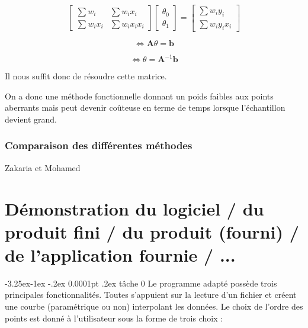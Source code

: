 \documentclass[a4paper,12pt]{article} %
\makeatletter
\renewcommand\paragraph{\@startsection{paragraph}{4}{\z@}%
                                      {-3.25ex\@plus -1ex \@minus -.2ex}%
                                      {0.0001pt \@plus .2ex}%
                                      {\normalfont\normalsize\bfseries}}
\makeatother
\begin{document}
                    
                    
                        \[\begin{bmatrix} \sum w_i & \sum w_i x_i \\ \sum w_i x_i & \sum w_i x_i x_i \end{bmatrix}  \begin{bmatrix} \theta_0 \\ \theta_1 \end{bmatrix}   = \begin{bmatrix}  \sum w_i y_i \\  \sum w_i y_i x_i \end{bmatrix}\] 
                    
                        \[\iff \mathbf{A} \theta = \mathbf{b}\]
                    
                        \[\iff \theta = \mathbf{A}^{-1} \mathbf{b}\]
                    
                    Il nous suffit donc de résoudre cette matrice.
                    
                    On a donc une méthode fonctionnelle donnant un poids faibles aux points aberrants mais peut devenir coûteuse en terme de temps lorsque l'échantillon devient grand.

	\section{Comparaison des différentes méthodes}
        Zakaria et Mohamed

\renewcommand\partname{}
\part{Démonstration du logiciel / du produit fini / du produit (fourni) / de l'application fournie / ...}
\paragraph{tâche 0}
Le programme adapté possède trois principales fonctionnalités. Toutes s'appuient sur la lecture d'un fichier et créent une courbe (paramétrique ou non) interpolant les données.
Le choix de l'ordre des points est donné à l'utilisateur sous la forme de trois choix : 
\end{document}
